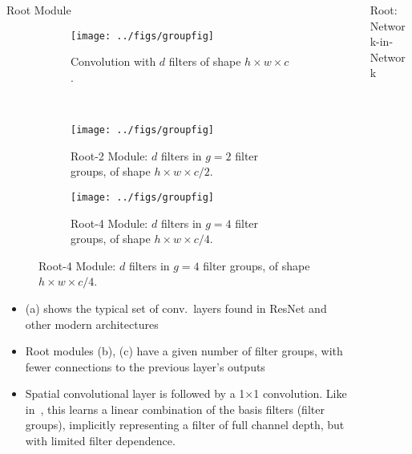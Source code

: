 \documentclass[final]{beamer}
\begin{document}
\begin{frame}{}
\begin{columns}[t]
\begin{column}{0.32\paperwidth}
\begin{block}{Root Module}
\begin{figure}[t]
\centering
\begin{subfigure}[b]{0.95\linewidth}
\centering
\texttt{[image: ../figs/groupfig]}
   \caption{Convolution with $d$ filters of shape $h\times w\times c$.}
   \label{fig:normalresnet}
\end{subfigure}\\
\begin{subfigure}[b]{0.95\linewidth}
\texttt{[image: ../figs/groupfig]}
   \caption{Root-2 Module: $d$ filters in $g = 2$ filter groups, of shape $h\times w\times c/2$.}
   \label{fig:rootresnet2}
\end{subfigure}
\begin{subfigure}[b]{0.95\linewidth}
\texttt{[image: ../figs/groupfig]}
   \caption{Root-4 Module: $d$ filters in $g = 4$ filter groups, of shape $h\times w\times c/4$.}
   \label{fig:rootresnet4}
\end{subfigure}
\label{fig:rootmodule}
\end{figure}
\begin{itemize}
    \item (a) shows the typical set of conv.\ layers found in ResNet and other modern architectures
    \item Root modules (b), (c) have a given number of filter groups, with fewer connections to the previous layer's outputs
    \item Spatial convolutional layer is followed by a 1$\times$1 convolution. Like in~\citep{Ioannou2016}, this learns a linear combination of the basis filters (filter groups), implicitly representing a filter of full channel depth, but with limited filter dependence.
\end{itemize}
\end{block}
\end{column}

\begin{column}{0.66\paperwidth}

\begin{block}{Root: Network-in-Network}


\end{block}
\end{column}
\end{columns}
\end{frame}
\end{document}
